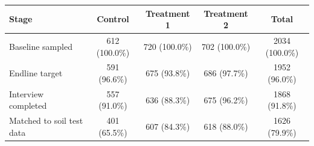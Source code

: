 \begin{tabular}{lcccc}
\hline\hline
Stage & Control & Treatment 1 & Treatment 2 & Total \\
\hline
Baseline
sampled & 612 (100.0\%) & 720 (100.0\%) & 702 (100.0\%) & 2034 (100.0\%) \\
Endline
target & 591 (96.6\%) & 675 (93.8\%) & 686 (97.7\%) & 1952 (96.0\%) \\
Interview
completed & 557 (91.0\%) & 636 (88.3\%) & 675 (96.2\%) & 1868 (91.8\%) \\
Matched to
soil test data & 401 (65.5\%) & 607 (84.3\%) & 618 (88.0\%) & 1626 (79.9\%) \\
\hline\hline
\end{tabular}
